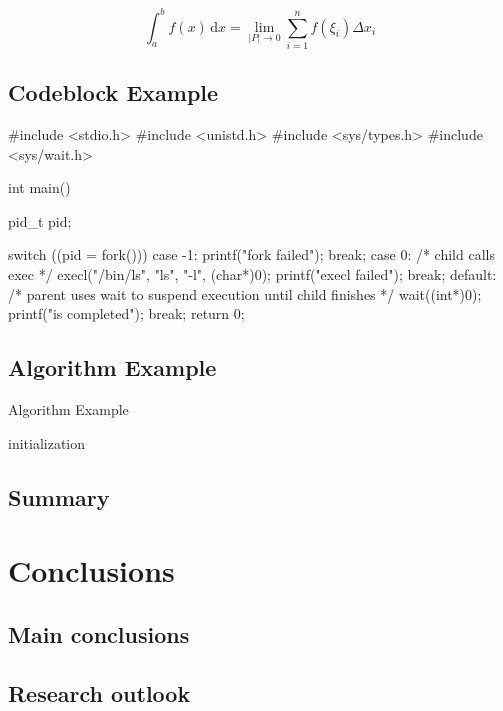 \begin{equation}
  \int_{a}^b f(x)\,\mathrm{d}x=\lim_{|P|\rightarrow 0}\sum_{i=1}^n f(\xi_i)\Delta x_i
\end{equation}

\section{Codeblock Example}

\begin{codeblock}[language=C]
#include <stdio.h>
#include <unistd.h>
#include <sys/types.h>
#include <sys/wait.h>

int main() {
  pid_t pid;

  switch ((pid = fork())) {
  case -1:
    printf("fork failed\n");
    break;
  case 0:
    /* child calls exec */
    execl("/bin/ls", "ls", "-l", (char*)0);
    printf("execl failed\n");
    break;
  default:
    /* parent uses wait to suspend execution until child finishes */
    wait((int*)0);
    printf("is completed\n");
    break;
  }
  return 0;
}
\end{codeblock}

\section{Algorithm Example}

\begin{algorithm}[htb]
  \caption{Algorithm Example}
  \label{algo:algorithm}
  \small
  \SetAlgoLined

  initialization\;
\end{algorithm}

\section{Summary}

\lipsum[7]

\chapter{Conclusions}

\section{Main conclusions}

\lipsum[8]

\section{Research outlook}

\lipsum[9]

